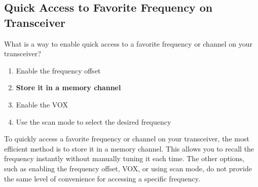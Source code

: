 \subsection{Quick Access to Favorite Frequency on Transceiver}
\label{T4B04}

\begin{tcolorbox}[colback=gray!10!white,colframe=black!75!black,title=T4B04]
What is a way to enable quick access to a favorite frequency or channel on your transceiver?
\begin{enumerate}[noitemsep]
    \item Enable the frequency offset
    \item \textbf{Store it in a memory channel}
    \item Enable the VOX
    \item Use the scan mode to select the desired frequency
\end{enumerate}
\end{tcolorbox}

To quickly access a favorite frequency or channel on your transceiver, the most efficient method is to store it in a memory channel. This allows you to recall the frequency instantly without manually tuning it each time. The other options, such as enabling the frequency offset, VOX, or using scan mode, do not provide the same level of convenience for accessing a specific frequency.